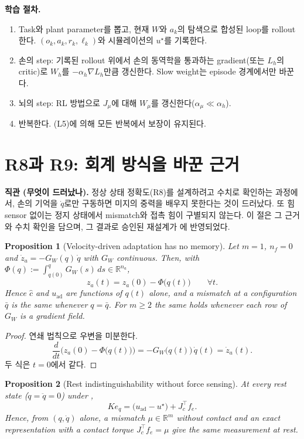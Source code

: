 \documentclass[11pt]{article}\usepackage[margin=1in]{geometry}\usepackage{amsmath,amssymb,amsthm,mathtools}\usepackage{graphicx}\graphicspath{{figures/}{../figures/}{figs/}{./}}\usepackage{enumitem}\usepackage{hyperref}\usepackage{cleveref}\usepackage{tikz}\usetikzlibrary{arrows.meta,positioning,calc,shapes.geometric}\usepackage{float}\usepackage{rotating}\usepackage[most]{tcolorbox}\usepackage{kotex}\usepackage{booktabs}\usepackage{longtable}\emergencystretch=1.6em\tolerance=2000 \crefname{assumption}{Assumption}{Assumptions}\Crefname{assumption}{Assumption}{Assumptions}\crefname{definition}{Definition}{Definitions}\Crefname{definition}{Definition}{Definitions}\crefname{proposition}{Proposition}{Propositions}\Crefname{proposition}{Proposition}{Propositions}\crefname{fact}{Fact}{Facts}\Crefname{fact}{Fact}{Facts} \newtheorem{assumption}{Assumption}\newtheorem{definition}{Definition}\newtheorem{lemma}{Lemma}\newtheorem{proposition}{Proposition}\newtheorem{theorem}{Theorem}\newtheorem{corollary}{Corollary}\newtheorem{fact}{Fact}\theoremstyle{remark}\newtheorem{remark}{Remark} \newcommand{\R}{\mathbb{R}}\newcommand{\xb}{\bar x}\newcommand{\Ab}{\bar A}\newcommand{\By}{\bar B_y}\newcommand{\U}{\mathcal U}\newcommand{\Z}{\mathcal Z}
\begin{document}
\textbf{학습 절차.}
\begin{enumerate}
\item Task와 plant parameter를 뽑고, 현재 $W$와 $a_k$의 탐색으로 합성된 loop를 rollout한다. $(o_k,a_k,r_k,\ell_k)$와 시뮬레이션의 $u^\star$를 기록한다.
\item 손의 step: 기록된 rollout 위에서 손의 동역학을 통과하는 gradient(또는 $L_h$의 critic)로 $W_h$를 $-\alpha_h\nabla L_h$만큼 갱신한다. Slow weight는 episode 경계에서만 바꾼다.
\item 뇌의 step: RL 방법으로 $J_\mu$에 대해 $W_\mu$를 갱신한다($\alpha_\mu\ll\alpha_h$).
\item 반복한다. (L5)에 의해 모든 반복에서 보장이 유지된다.
\end{enumerate}

\section{R8과 R9: 회계 방식을 바꾼 근거}
\label{sec:r8r9}

\textbf{직관 (무엇이 드러났나).} 정상 상태 정확도(R8)를 설계하려고 수치로 확인하는 과정에서, 손의 기억을 $\dot q$로만 구동하면 미지의 중력을 배우지 못한다는 것이 드러났다. 또 힘 sensor 없이는 정지 상태에서 mismatch와 접촉 힘이 구별되지 않는다. 이 절은 그 근거와 수치 확인을 담으며, 그 결과로 승인된 재설계가 에 반영되었다.

\begin{proposition}[Velocity-driven adaptation has no memory]
\label{prop:memoryless}
Let $m=1$, $n_f=0$ and $\dot z_a=-G_W(q)\,\dot q$ with $G_W$ continuous. Then, with $\Phi(q):=\int_{q(0)}^{q}G_W(s)\,ds\in\R^{n_a}$,
\[
z_a(t)=z_a(0)-\Phi\big(q(t)\big)\qquad\forall t .
\]
Hence $\hat c$ and $u_{\mathrm{ad}}$ are functions of $q(t)$ alone, and a mismatch at a configuration $\bar q$ is the same whenever $q=\bar q$. For $m\ge2$ the same holds whenever each row of $G_W$ is a gradient field.
\end{proposition}

\begin{proof}
연쇄 법칙으로 우변을 미분한다.
\[
\frac{d}{dt}\Big(z_a(0)-\Phi\big(q(t)\big)\Big)=-G_W\big(q(t)\big)\,\dot q(t)=\dot z_a(t) .
\]
두 식은 $t=0$에서 같다.
\end{proof}

\begin{proposition}[Rest indistinguishability without force sensing]
\label{prop:indist}
At every rest state ($\dot q=\ddot q=0$) under ,
\[
Ke_q=\big(u_{\mathrm{ad}}-u^\star\big)+J_c^\top f_e .
\]
Hence, from $(q,\dot q)$ alone, a mismatch $\mu\in\R^m$ without contact and an exact representation with a contact torque $J_c^\top f_e=\mu$ give the same measurement at rest.
\end{proposition}
\end{document}
